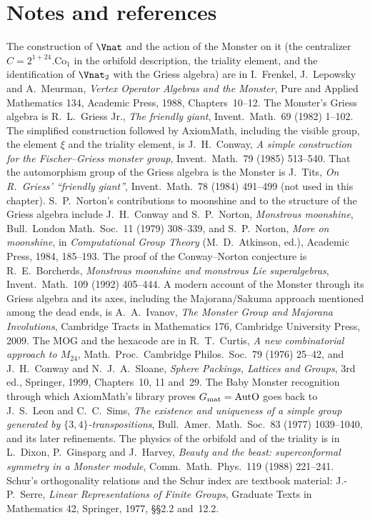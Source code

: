 \section{Notes and references}\label{ch22:sec:notes}

The construction of $\Vnat$ and the action of the Monster on it (the centralizer $C=2^{1+24}.\mathrm{Co}_1$ in the orbifold
description, the triality element, and the identification of $\Vnat_2$ with the Griess algebra) are in I.~Frenkel,
J.~Lepowsky and A.~Meurman, \emph{Vertex Operator Algebras and the Monster}, Pure and Applied Mathematics 134, Academic Press,
1988, Chapters~10--12.  The Monster's Griess algebra is R.~L.~Griess Jr., \emph{The friendly giant}, Invent.\ Math.\ 69 (1982)
1--102.  The simplified construction followed by AxiomMath, including the visible group, the element $\xi$ and the triality
element, is J.~H.~Conway, \emph{A simple construction for the Fischer--Griess monster group}, Invent.\ Math.\ 79 (1985)
513--540.  That the automorphism group of the Griess algebra is the Monster is J.~Tits, \emph{On R.~Griess' ``friendly giant''},
Invent.\ Math.\ 78 (1984) 491--499 (not used in this chapter).  S.~P.~Norton's contributions to moonshine and to the structure
of the Griess algebra include J.~H.~Conway and S.~P.~Norton, \emph{Monstrous moonshine}, Bull.\ London Math.\ Soc.\ 11 (1979)
308--339, and S.~P.~Norton, \emph{More on moonshine}, in \emph{Computational Group Theory} (M.~D.~Atkinson, ed.), Academic Press,
1984, 185--193.  The proof of the Conway--Norton conjecture is R.~E.~Borcherds, \emph{Monstrous moonshine and monstrous Lie
superalgebras}, Invent.\ Math.\ 109 (1992) 405--444.  A modern account of the Monster through its Griess algebra and its axes,
including the Majorana/Sakuma approach mentioned among the dead ends, is A.~A.~Ivanov, \emph{The Monster Group and Majorana
Involutions}, Cambridge Tracts in Mathematics 176, Cambridge University Press, 2009.  The MOG and the hexacode are in
R.~T.~Curtis, \emph{A new combinatorial approach to $M_{24}$}, Math.\ Proc.\ Cambridge Philos.\ Soc.\ 79 (1976) 25--42, and
J.~H.~Conway and N.~J.~A.~Sloane, \emph{Sphere Packings, Lattices and Groups}, 3rd ed., Springer, 1999, Chapters~10, 11 and~29.
The Baby Monster recognition through which AxiomMath's library proves $G_{\mathrm{mat}}=\mathrm{AutO}$ goes back to J.~S.~Leon and
C.~C.~Sims, \emph{The existence and uniqueness of a simple group generated by $\{3,4\}$-transpositions}, Bull.\ Amer.\ Math.\
Soc.\ 83 (1977) 1039--1040, and its later refinements.  The physics of the orbifold and of the triality is in L.~Dixon,
P.~Ginsparg and J.~Harvey, \emph{Beauty and the beast: superconformal symmetry in a Monster module}, Comm.\ Math.\ Phys.\ 119
(1988) 221--241.  Schur's orthogonality relations and the Schur index are textbook material: J.-P.~Serre, \emph{Linear
Representations of Finite Groups}, Graduate Texts in Mathematics 42, Springer, 1977, \S\S2.2 and~12.2.

